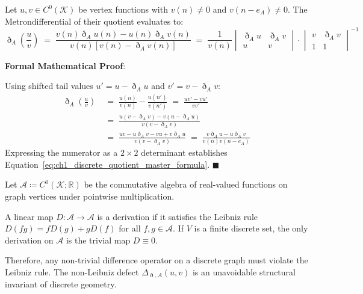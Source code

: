 \documentclass[
    12pt,
    a4paper,
    headings=normal,
    twoside=false,
    open=any,
    parskip=half
]{scrbook}
\newcommand{\ethop}{\eth}
\newenvironment{myproof}[1][]{%
  \par\vspace{6pt}\noindent\textbf{\sffamily\color{maincolor}Formal Mathematical Proof\ifstrempty{#1}{}{ (#1)}}:\par\nopagebreak
}{%
  \penalty50\hfill\ensuremath{\blacksquare}\par\vspace{6pt}
}
\begin{document}
\begin{phystheorem}\label{thm:ch1_discrete_quotient_rule}
Let $u, v \in C^0(\mathcal{K})$ be vertex functions with $v(n) \ne 0$ and $v(n - e_A) \ne 0$. The Metrondifferential of their quotient evaluates to:
\begin{equation}
\boxed{\ethop_A \left( \frac{u}{v} \right) \;=\; \frac{v(n) \ethop_A u(n) - u(n) \ethop_A v(n)}{v(n) \left[ v(n) - \ethop_A v(n) \right]} \;=\; \frac{1}{v(n)} \begin{vmatrix} \ethop_A u & \ethop_A v \\ u & v \end{vmatrix} \cdot \begin{vmatrix} v & \ethop_A v \\ 1 & 1 \end{vmatrix}^{-1}}
\label{eq:ch1_discrete_quotient_master_formula}
\end{equation}
\end{phystheorem}


\begin{myproof}
Using shifted tail values $u' = u - \ethop_A u$ and $v' = v - \ethop_A v$:
\begin{align*}
\ethop_A \left( \frac{u}{v} \right) &\;=\; \frac{u(n)}{v(n)} - \frac{u(n')}{v(n')} \;=\; \frac{u v' - v u'}{v v'} \\
&\;=\; \frac{u(v - \ethop_A v) - v(u - \ethop_A u)}{v(v - \ethop_A v)} \\
&\;=\; \frac{uv - u\ethop_A v - vu + v\ethop_A u}{v(v - \ethop_A v)} \;=\; \frac{v \ethop_A u - u \ethop_A v}{v(n) v(n - e_A)}
\end{align*}
Expressing the numerator as a $2 \times 2$ determinant establishes Equation~\eqref{eq:ch1_discrete_quotient_master_formula}.
\end{myproof}

\begin{physscholion}
Let $\mathcal{A} \coloneqq C^0(\mathcal{K}; \mathbb{R})$ be the commutative algebra of real-valued functions on graph vertices under pointwise multiplication. 

A linear map $D \colon \mathcal{A} \to \mathcal{A}$ is a derivation if it satisfies the Leibniz rule $D(fg) = f D(g) + g D(f)$ for all $f, g \in \mathcal{A}$. If $V$ is a finite discrete set, the only derivation on $\mathcal{A}$ is the trivial map $D \equiv 0$. 

Therefore, any non-trivial difference operator on a discrete graph must violate the Leibniz rule. The non-Leibniz defect $\Delta_{\ethop, A}(u, v)$ is an unavoidable structural invariant of discrete geometry.
\end{physscholion}
\end{document}
